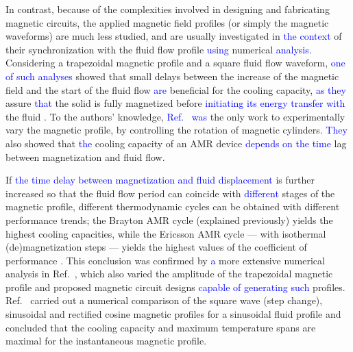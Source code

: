 \documentclass[referee]{svjour3}
\begin{document}
In contrast, because of the complexities involved in designing and fabricating magnetic circuits, the applied magnetic field profiles (or simply the magnetic waveforms) are much less studied, and are usually investigated in \textcolor{blue}{the context} of their synchronization with the fluid flow profile \textcolor{blue}{using} numerical \textcolor{blue}{analysis}. Considering a trapezoidal magnetic profile and a square fluid flow waveform, \textcolor{blue}{one of such analyses} showed that small delays between the increase of the magnetic field and the start of the fluid flow \textcolor{blue}{are} beneficial for the cooling capacity, \textcolor{blue}{as they} assure \textcolor{blue}{that} the solid is fully magnetized before \textcolor{blue}{initiating its energy transfer with} the fluid \cite{bib:bjoerk11_amr}. To the authors' knowledge, \textcolor{blue}{Ref.~\cite{bib:benedict16_desig} was} the only work to experimentally vary the magnetic profile, by controlling the rotation of magnetic cylinders. \textcolor{blue}{They} also showed that \textcolor{blue}{the} cooling capacity of an AMR device \textcolor{blue}{depends on the time} lag between magnetization and fluid flow.

If \textcolor{blue}{the time delay between magnetization and fluid displacement} is further increased so that the fluid flow period can coincide with \textcolor{blue}{different} stages of the magnetic profile, different thermodynamic cycles can be obtained with different performance trends; the Brayton AMR cycle (explained previously) yields the highest cooling capacities, while the Ericsson AMR cycle --- with isothermal (de)magnetization steps --- yields the highest values of the coefficient of performance \cite{bib:plaznik13-numer}. This conclusion was confirmed by \textcolor{blue}{a} more extensive numerical analysis in Ref.~\cite{bib:kitanovski}, which also varied the amplitude of the trapezoidal magnetic profile and proposed magnetic circuit designs \textcolor{blue}{capable of generating such} profiles. Ref.~\cite{bib:asme-mce} carried out a numerical comparison of the square wave (step change), sinusoidal and rectified cosine magnetic profiles for a sinusoidal fluid profile and concluded that the cooling capacity and maximum temperature spans are maximal for the instantaneous magnetic profile. 
\end{document}
